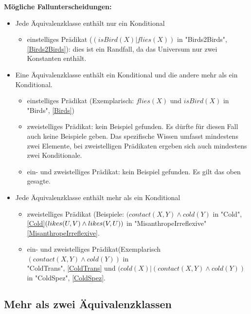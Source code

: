 \documentclass[a4paper, 11pt]{book}
\begin{document}
\textbf{Mögliche Fallunterscheidungen:} \label{Fallunterscheidung Formel 2Aequi}
\begin{itemize}
	\item Jede Äquivalenzklasse enthält nur ein Konditional 
	\begin{itemize}
		\item einstelliges Prädikat ($ (isBird(X)|flies(X)) $ in "{}Birds2Birds"{}, \ref{Birds2Birds}): dies ist ein Randfall, da das Universum nur zwei Konstanten enthält.
	\end{itemize}
	\item Eine Äquivalenzklasse enthält ein Konditional und die andere mehr als ein Konditional. 
	\begin{itemize}
		\item einstelliges Prädikat (Exemplarisch: $ flies(X) $ und $ isBird(X) $ in "{}Birds"{}, \ref{Birds}) 
		\item zweistelliges Prädikat: kein Beispiel gefunden. Es dürfte für diesen Fall auch keine Beispiele geben. Das spezifische Wissen umfasst mindestens zwei Elemente, bei zweistelligen Prädikaten ergeben sich auch mindestens zwei Konditionale.
		\item  ein- und zweistelliges Prädikat: kein Beispiel gefunden. Es gilt das oben gesagte.   
	\end{itemize}
	\item Jede Äquivalenzklasse enthält mehr als ein Konditional 
	\begin{itemize}
		\item zweistelliges Prädikat (Beispiele: $ (contact(X,Y) \land cold(Y) $ in "{}Cold"{}, \ref{Cold}$ \\ (likes(U,V) \land likes(V,U)) $ in "{}MisanthropeIrreflexive"{} \ref{MisanthropeIrreflexive}.  
		\item ein- und zweistelliges Prädikat(Exemplarisch $ (contact(X,Y) \land cold(Y)) $ in \\ "{}ColdTrans"{}, \ref{ColdTrans} und  $  (cold(X) | (contact(X,Y) \land cold(Y)) $ in "{}ColdSpez"{}, \ref{ColdSpez}.
	\end{itemize}
\end{itemize}


\subsection{Mehr als zwei Äquivalenzklassen} 
\end{document}
